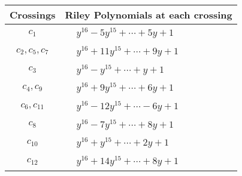 \documentclass[1p]{elsarticle_modified}
\theoremstyle{definition}
\begin{document}
\begin{tabular}{m{50pt}|m{274pt}}
Crossings & \hspace{64pt}Riley Polynomials at each crossing \\
\hline $$\begin{aligned}c_{1}\end{aligned}$$&$\begin{aligned}
&y^{16}-5 y^{15}+\cdots+5 y+1
\end{aligned}$\\
\hline $$\begin{aligned}c_{2},c_{5},c_{7}\end{aligned}$$&$\begin{aligned}
&y^{16}+11 y^{15}+\cdots+9 y+1
\end{aligned}$\\
\hline $$\begin{aligned}c_{3}\end{aligned}$$&$\begin{aligned}
&y^{16}- y^{15}+\cdots+y+1
\end{aligned}$\\
\hline $$\begin{aligned}c_{4},c_{9}\end{aligned}$$&$\begin{aligned}
&y^{16}+9 y^{15}+\cdots+6 y+1
\end{aligned}$\\
\hline $$\begin{aligned}c_{6},c_{11}\end{aligned}$$&$\begin{aligned}
&y^{16}-12 y^{15}+\cdots-6 y+1
\end{aligned}$\\
\hline $$\begin{aligned}c_{8}\end{aligned}$$&$\begin{aligned}
&y^{16}-7 y^{15}+\cdots+8 y+1
\end{aligned}$\\
\hline $$\begin{aligned}c_{10}\end{aligned}$$&$\begin{aligned}
&y^{16}+y^{15}+\cdots+2 y+1
\end{aligned}$\\
\hline $$\begin{aligned}c_{12}\end{aligned}$$&$\begin{aligned}
&y^{16}+14 y^{15}+\cdots+8 y+1
\end{aligned}$\\
\hline
\end{tabular}\\~\\
\end{document}
